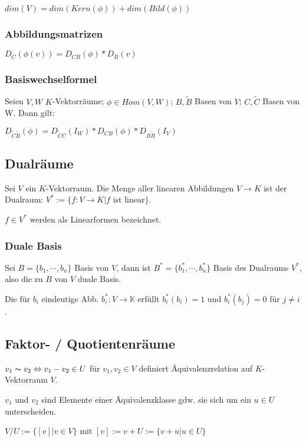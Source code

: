 $dim(V) = dim(Kern(\phi)) + dim(Bild(\phi))$

\subsubsection*{Abbildungsmatrizen}

$D_C(\phi(v)) = D_{CB}(\phi) * D_B(v)$

\subsubsection*{Basiswechselformel}

Seien $V, W$ $K$-Vektorräume; $\phi \in Hom(V, W)$; $B, \tilde B$ Basen von $V$; $C, \tilde C$ Basen von W. Dann gilt:

$D_{\tilde C \tilde B}(\phi) = D_{\tilde C C}(I_W) * D_{CB}(\phi) * D_{B\tilde B}(I_V)$

\subsection*{Dualräume}

Sei $V$ ein $K$-Vektorraum. Die Menge aller linearen Abbildungen $V \rightarrow K$ ist der Dualraum: $V^* := \{f: V \rightarrow K | f \text{ ist linear}\}$.

$f \in V^*$ werden als Linearformen bezeichnet.

\subsubsection*{Duale Basis}

Sei $B = \{b_1, \cdots, b_n\}$ Basis von $V$, dann ist $B^* = \{b_1^*, \cdots, b_n^*\}$ Basis des Dualraums $V^*$, also die zu $B$ von $V$ duale Basis.

Die für $b_i$ eindeutige Abb. $b_i^* : V \rightarrow \mathbb{K}$ erfüllt $b_i^*(b_i) = 1$ und $b_i^*(b_j) = 0$ für $j\neq i$.

\subsection*{Faktor- / Quotientenräume}

$v_1 \thicksim v_2 \Leftrightarrow v_1 - v_2 \in U$ für $v_1, v_2 \in V$ definiert Äquivalenzrelation auf $K$-Vektorraum $V$.

$v_1$ und $v_2$ sind Elemente einer Äquivalenzklasse gdw. sie sich um ein $u \in U$ unterscheiden.

$V/U := \{[v] | v \in V\}$ mit $[v] := v+U := \{v+u|u \in U\}$

